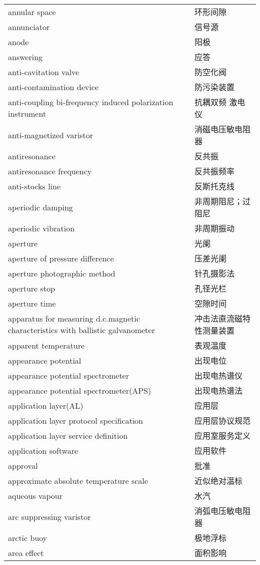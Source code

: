 \documentclass[
]{article}
\begin{document}
\begin{longtable}[]{@{}ll@{}}
annular space & 环形间隙 \\
annunciator & 信号源 \\
anode & 阳极 \\
answering & 应答 \\
anti-cavitation valve & 防空化阀 \\
anti-contamination device & 防污染装置 \\
anti-coupling bi-frequency induced polarization instrument & 抗耦双频
激电仪 \\
anti-magnetized varistor & 消磁电压敏电阻器 \\
antiresonance & 反共振 \\
antiresonance frequency & 反共振频率 \\
anti-stocks line & 反斯托克线 \\
aperiodic damping & 非周期阻尼；过阻尼 \\
aperiodic vibration & 非周期振动 \\
aperture & 光阑 \\
aperture of pressure difference & 压差光阑 \\
aperture photographic method & 针孔摄影法 \\
aperture stop & 孔径光栏 \\
aperture time & 空隙时间 \\
apparatus for measuring d.c.magnetic characteristics with ballistic
galvanometer & 冲击法直流磁特性测量装置 \\
apparent temperature & 表观温度 \\
appearance potential & 出现电位 \\
appearance potential spectrometer & 出现电热谱仪 \\
appearance potential spectrometer(APS) & 出现电热谱法 \\
application layer(AL) & 应用层 \\
application layer protocol specification & 应用层协议规范 \\
application layer service definition & 应用室服务定义 \\
application software & 应用软件 \\
approval & 批准 \\
approximate absolute temperature scale & 近似绝对温标 \\
aqueous vapour & 水汽 \\
arc suppressing varistor & 消弧电压敏电阻器 \\
arctic buoy & 极地浮标 \\
area effect & 面积影响 \\

\end{longtable}
\end{document}
